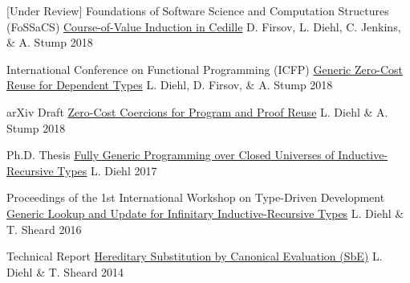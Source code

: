 

\begin{cventries}

  \cventry
    {[Under Review] Foundations of Software Science and Computation Structures (FoSSaCS)} %
    {\href{http://firsov.ee/cov-induction/}{Course-of-Value Induction in Cedille}} %
    {D. Firsov, L. Diehl, C. Jenkins, \& A. Stump} %
    {2018} %
    {}

  \cventry
    {International Conference on Functional Programming (ICFP)} %
    {\href{https://github.com/larrytheliquid/generic-reuse}{Generic Zero-Cost Reuse for Dependent Types}} %
    {L. Diehl, D. Firsov, \& A. Stump} %
    {2018} %
    {}

  \cventry
    {arXiv Draft} %
    {\href{https://github.com/larrytheliquid/zero-cost-coercions}{Zero-Cost Coercions for Program and Proof Reuse}} %
    {L. Diehl \& A. Stump} %
    {2018} %
    {}

  \cventry
    {Ph.D. Thesis} %
    {\href{https://github.com/larrytheliquid/thesis}{Fully Generic Programming over Closed Universes of Inductive-Recursive Types}} %
    {L. Diehl} %
    {2017} %
    {}

  \cventry
    {Proceedings of the 1st International Workshop on Type-Driven Development} %
    {\href{https://github.com/larrytheliquid/infir}{Generic Lookup and Update for Infinitary Inductive-Recursive Types}} %
    {L. Diehl \& T. Sheard} %
    {2016} %
    {}

  \cventry
    {Technical Report} %
    {\href{https://github.com/larrytheliquid/sbe}{Hereditary Substitution by Canonical Evaluation (SbE)}} %
    {L. Diehl \& T. Sheard} %
    {2014} %
    {}


\end{cventries}
